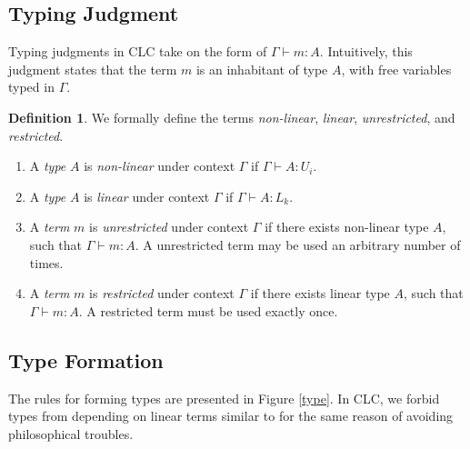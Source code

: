 \documentclass[sigplan,screen,review,authordraft]{acmart}
\theoremstyle{definition}
\newtheorem{definition}{Definition}[section]
\begin{document}
  \subsection{Typing Judgment}
  Typing judgments in CLC take on the form of $\Gamma \vdash m : A$. Intuitively, this judgment states that the term $m$ is an inhabitant of type $A$, with free variables typed in $\Gamma$.

  \begin{definition} We formally define the terms \textit{non-linear}, \textit{linear}, \textit{unrestricted}, and \textit{restricted}.
    \begin{enumerate}
      \item A \textit{type} $A$ is \textit{non-linear} under context $\Gamma$ if $\Gamma \vdash A : U_i$.
      \item A \textit{type} $A$ is \textit{linear} under context $\Gamma$ if $\Gamma \vdash A : L_k$.
      \item A \textit{term} $m$ is \textit{unrestricted} under context $\Gamma$ if there exists non-linear type $A$, such that $\Gamma \vdash m : A$. A unrestricted term may be used an arbitrary number of times.
      \item A \textit{term} $m$ is \textit{restricted} under context $\Gamma$ if there exists linear type $A$, such that $\Gamma \vdash m : A$. A restricted term must be used exactly once.
    \end{enumerate}
  \end{definition}

  \subsection{Type Formation} \label{tyformation}
  The rules for forming types are presented in Figure \ref{type}. In CLC, we forbid types from depending on linear terms similar to \cite{llf,neel15} for the same reason of avoiding philosophical troubles.
\end{document}
